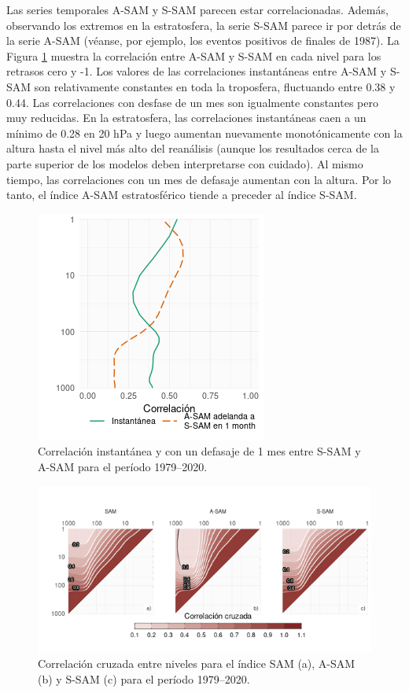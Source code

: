 \documentclass[12pt,oneside]{reedthesis}
\begin{document}
Las series temporales A-SAM y S-SAM parecen estar correlacionadas.
Además, observando los extremos en la estratosfera, la serie S-SAM parece ir por detrás de la serie A-SAM (véanse, por ejemplo, los eventos positivos de finales de 1987).
La Figura \ref{fig:cor-lev} muestra la correlación entre A-SAM y S-SAM en cada nivel para los retrasos cero y -1.
Los valores de las correlaciones instantáneas entre A-SAM y S-SAM son relativamente constantes en toda la troposfera, fluctuando entre 0.38 y 0.44.
Las correlaciones con desfase de un mes son igualmente constantes pero muy reducidas.
En la estratosfera, las correlaciones instantáneas caen a un mínimo de 0.28 en 20 hPa y luego aumentan nuevamente monotónicamente con la altura hasta el nivel más alto del reanálisis (aunque los resultados cerca de la parte superior de los modelos deben interpretarse con cuidado).
Al mismo tiempo, las correlaciones con un mes de defasaje aumentan con la altura.
Por lo tanto, el índice A-SAM estratosférico tiende a preceder al índice S-SAM.



\begin{figure}
\includegraphics{figures/30-sam/cor-lev-1} \caption{Correlación instantánea y con un defasaje de 1 mes entre S-SAM y A-SAM para el período 1979--2020.}\label{fig:cor-lev}
\end{figure}



\begin{figure}
\includegraphics{figures/30-sam/cross-correlation-1} \caption{Correlación cruzada entre niveles para el índice SAM (a), A-SAM (b) y S-SAM (c) para el período 1979--2020.}\label{fig:cross-correlation}
\end{figure}
\end{document}
